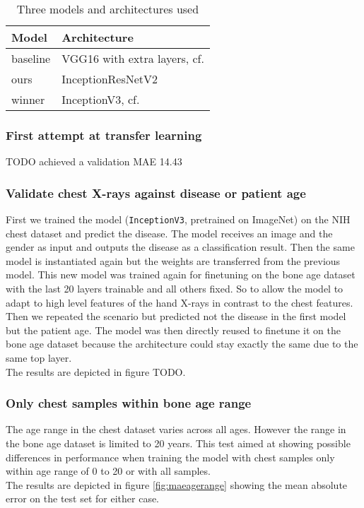 \documentclass[10pt,twocolumn,letterpaper]{article}
\begin{document}
\begin{table}[h]
\begin{center}
\begin{tabular}{|l|l|}
\hline
Model & Architecture \\
\hline\hline
baseline & VGG16 with extra layers, cf. \cite{kaggleboneage} \\
ours & InceptionResNetV2  \\
winner & InceptionV3, cf. \cite{16bitrsnachallenge} \\
\hline
\end{tabular}
\end{center}
\caption{Three models and architectures used}
\label{table:models}
\end{table}

\subsubsection{First attempt at transfer learning}
TODO achieved a validation MAE 14.43


\subsubsection{Validate chest X-rays against disease or patient age}
First we trained the model (\verb+InceptionV3+, pretrained on ImageNet) on the NIH chest dataset and predict the disease. The model receives an image and the gender as input and outputs the disease as a classification result. Then the same model is instantiated again but the weights are transferred from the previous model. This new model was trained again for finetuning on the bone age dataset with the last 20 layers trainable and all others fixed. So to allow the model to adapt to high level features of the hand X-rays in contrast to the chest features.\\
Then we repeated the scenario but predicted not the disease in the first model but the patient age. The model was then directly reused to finetune it on the bone age dataset because the architecture could stay exactly the same due to the same top layer.\\
The results are depicted in figure TODO.


\subsubsection{Only chest samples within bone age range}
The age range in the chest dataset varies across all ages. However the range in the bone age dataset is limited to 20 years. This test aimed at showing possible differences in performance when training the model with chest samples only within age range of 0 to 20 or with all samples.\\
The results are depicted in figure \ref{fig:maeagerange} showing the mean absolute error on the test set for either case.
\end{document}
